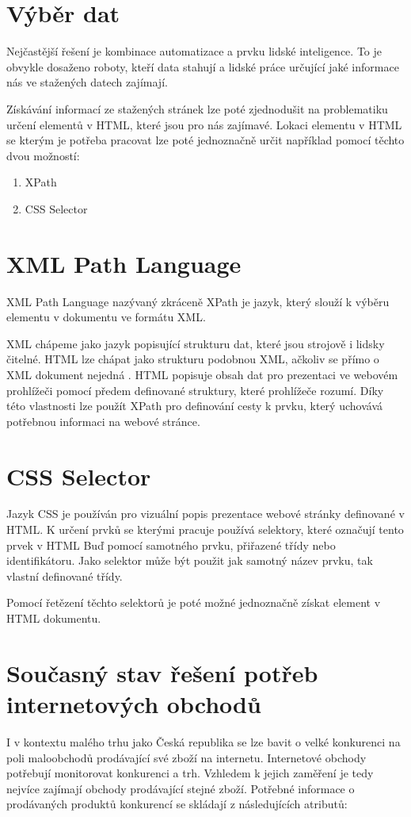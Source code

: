 \documentclass[thesis=B,czech]{FITthesis}[2012/06/26]
\begin{document}
\section{Výběr dat}
Nejčastější řešení je kombinace automatizace a prvku lidské inteligence.
To je obvykle dosaženo roboty, kteří data stahují a lidské práce určující jaké informace nás ve stažených datech zajímají.
\par
Získávání informací ze stažených stránek lze poté zjednodušit na problematiku určení elementů v HTML, které jsou pro 
nás zajímavé.
Lokaci elementu v HTML se kterým je potřeba pracovat lze poté jednoznačně určit například pomocí těchto dvou možností:
\begin{enumerate}
\item XPath
\item CSS Selector
\end{enumerate}

\section{XML Path Language}
XML Path Language\cite{XPath} nazývaný zkráceně XPath je jazyk, který slouží k výběru elementu v dokumentu ve formátu XML\cite{XML}.
\par
XML chápeme jako jazyk popisující strukturu dat, které jsou strojově i lidsky čitelné.
HTML lze chápat jako strukturu podobnou XML, ačkoliv se přímo o XML dokument nejedná \cite{HTML}. 
HTML popisuje obsah dat pro prezentaci ve webovém prohlížeči pomocí předem definované struktury, které prohlížeče rozumí.
Díky této vlastnosti lze použít XPath pro definování cesty k prvku, který uchovává potřebnou informaci na webové stránce.
\par
\section{CSS Selector}
Jazyk CSS je používán pro vizuální popis prezentace webové stránky definované v HTML. K určení prvků se kterými
pracuje používá selektory, které označují tento prvek v HTML Buď pomocí samotného prvku, přiřazené třídy nebo
identifikátoru. Jako selektor může být použit jak samotný název prvku,
tak vlastní definované třídy.\cite{CSS}
\par
Pomocí řetězení těchto selektorů je poté možné jednoznačně získat element v HTML dokumentu.

\newpage

\section{Současný stav řešení potřeb internetových obchodů}
I v kontextu malého trhu jako Česká republika se lze bavit o velké konkurenci na poli 
maloobchodů prodávající své zboží na internetu.
Internetové obchody potřebují monitorovat konkurenci a trh. Vzhledem k jejich zaměření je tedy nejvíce zajímají 
obchody prodávající stejné zboží. Potřebné informace o prodávaných produktů konkurencí 
se skládají z následujících atributů:
\end{document}
